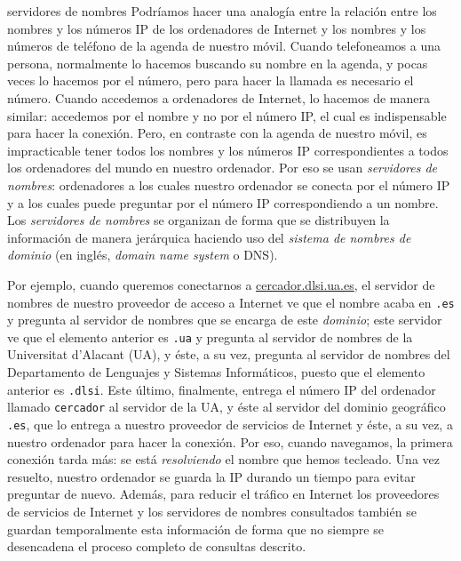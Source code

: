 \begin{persabermes}{servidores de nombres} Podríamos hacer una analogía entre la relación entre los nombres y los números IP de los ordenadores de Internet y los nombres y los números de teléfono de la agenda de nuestro móvil. Cuando telefoneamos a una persona, normalmente lo hacemos buscando su nombre en la agenda, y pocas veces lo hacemos por el número, pero para hacer la llamada es necesario el número. Cuando accedemos a ordenadores de Internet, lo hacemos de manera similar: accedemos por el nombre y no por el número IP, el cual es indispensable para hacer la conexión. Pero, en contraste con la agenda de nuestro móvil, es impracticable tener todos los nombres y los números IP correspondientes a todos los ordenadores del mundo en nuestro ordenador. Por eso se usan \emph{servidores de nombres}: ordenadores a los cuales nuestro ordenador se conecta por el número IP y a los cuales puede preguntar por el número IP correspondiendo a un nombre. Los \emph{servidores de nombres} se organizan de forma que se distribuyen la información de manera jerárquica haciendo uso del \emph{sistema de nombres de dominio} (en inglés, \emph{domain name system} o DNS). 

Por ejemplo, cuando queremos conectarnos a \url{cercador.dlsi.ua.es}, el servidor de nombres de nuestro proveedor de acceso a Internet ve que el nombre acaba en \texttt{.es} y pregunta al servidor de nombres que se encarga de este \emph{dominio}; este servidor ve que el elemento anterior es \texttt{.ua} y pregunta al servidor de nombres de la Universitat d'Alacant (UA), y éste, a su vez, pregunta al servidor de nombres del Departamento de Lenguajes y Sistemas Informáticos, puesto que el elemento anterior es \texttt{.dlsi}. Este último, finalmente, entrega el número IP del ordenador llamado \texttt{cercador} al servidor de la UA, y éste al servidor del dominio geográfico \texttt{.es}, que lo entrega a nuestro proveedor de servicios de Internet y éste, a su vez, a nuestro ordenador para hacer la conexión. Por eso, cuando navegamos, la primera conexión tarda más: se está \emph{resolviendo} el nombre que hemos tecleado. Una vez resuelto, nuestro ordenador se guarda la IP durando un tiempo para evitar preguntar de nuevo. Además, para reducir el tráfico en Internet los proveedores de servicios de Internet y los servidores de nombres consultados también se guardan temporalmente esta información de forma que no siempre se desencadena el proceso completo de consultas descrito. \end{persabermes} 

